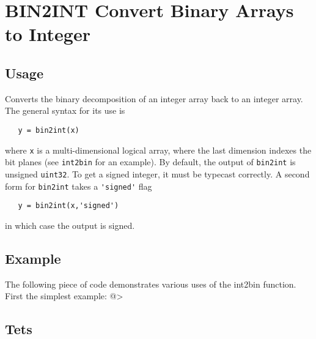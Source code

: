 \section{BIN2INT Convert Binary Arrays to Integer}

\subsection{Usage}

Converts the binary decomposition of an integer array back
to an integer array.  The general syntax for its use is
\begin{verbatim}
   y = bin2int(x)
\end{verbatim}
where \verb|x| is a multi-dimensional logical array, where the last
dimension indexes the bit planes (see \verb|int2bin| for an example).
By default, the output of \verb|bin2int| is unsigned \verb|uint32|.  To
get a signed integer, it must be typecast correctly.  A second form for
\verb|bin2int| takes a \verb|'signed'| flag
\begin{verbatim}
   y = bin2int(x,'signed')
\end{verbatim}
in which case the output is signed.
\subsection{Example}

The following piece of code demonstrates various uses of the int2bin
function.  First the simplest example:
@>
\subsection{Tets}

